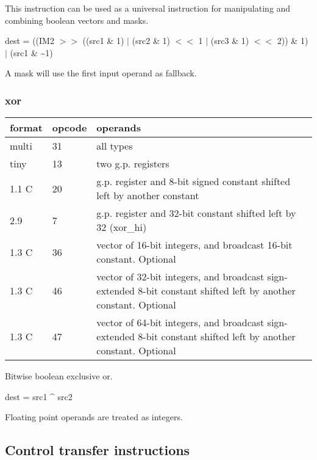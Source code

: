 \documentclass[forwardcom.tex]{subfiles}
\begin{document}
This instruction can be used as a universal instruction for manipulating and combining boolean vectors and masks.
\vspace{2mm}

dest = ((IM2 $>>$ ((src1 \& 1) $|$ (src2 \& 1) $<<$ 1 $|$ (src3 \& 1) $<<$ 2)) \& 1) $|$ (src1 \& \~{}1)
\vspace{2mm}

A mask will use the first input operand as fallback.

\subsubsection{xor}
\label{table:xorInstruction}
\begin{tabular}{|p{12mm}|p{12mm}|p{110mm}|}
\hline
\bfseries format & \bfseries opcode & \bfseries operands \\ \hline
multi & 31 & all types \\ \hline
tiny  & 13 & two g.p. registers \\ \hline
1.1 C & 20 & g.p. register and 8-bit signed constant shifted left by another constant \\ \hline
2.9   &  7 & g.p. register and 32-bit constant shifted left by 32 (xor\_hi) \\ \hline
1.3 C & 36 & vector of 16-bit integers, and broadcast 16-bit constant. Optional \\ \hline
1.3 C & 46 & vector of 32-bit integers, and broadcast sign-extended 8-bit constant shifted left by another constant. Optional \\ \hline
1.3 C & 47 & vector of 64-bit integers, and broadcast sign-extended 8-bit constant shifted left by another constant. Optional \\ \hline
\end{tabular}
\vspace{2mm}

Bitwise boolean exclusive or.
\vspace{2mm}

dest = src1 \^{} src2
\vspace{2mm}

Floating point operands are treated as integers.

\subsection{Control transfer instructions}
\end{document}
